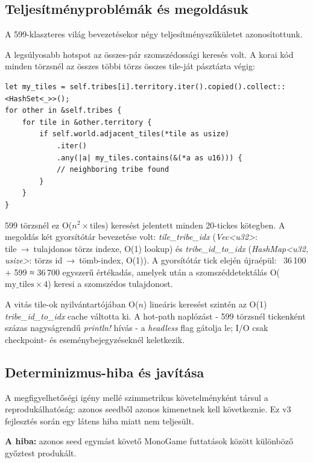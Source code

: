 \subsection*{Teljesítményproblémák és megoldásuk}

A 599-klaszteres világ bevezetésekor négy teljesítményszűkületet azonosítottunk.

A legsúlyosabb hotspot az összes-pár szomszédossági keresés volt.
A korai kód minden törzsnél az összes többi törzs összes tile-ját pásztázta végig:

\begin{lstlisting}[language={},basicstyle=\ttfamily\scriptsize,breaklines=true,caption={Régi all-pairs tile-scan: O(n\textsuperscript{2} × tiles) bottleneck}]
let my_tiles = self.tribes[i].territory.iter().copied().collect::<HashSet<_>>();
for other in &self.tribes {
    for tile in &other.territory {
        if self.world.adjacent_tiles(*tile as usize)
            .iter()
            .any(|a| my_tiles.contains(&(*a as u16))) {
            // neighboring tribe found
        }
    }
}
\end{lstlisting}

599 törzsnél ez O($n^2 \times \text{tiles}$) keresést jelentett minden 20-tickes kötegben.
A megoldás két gyorsítótár bevezetése volt:
\textit{tile\_tribe\_idx} (\textit{Vec<u32>}: tile~→~tulajdonos törzs indexe, O(1) lookup)
és \textit{tribe\_id\_to\_idx} (\textit{HashMap<u32, usize>}: törzs id~→~tömb-index, O(1)).
A gyorsítótár tick elején újraépül: ~36\,100 + 599 ≈ 36\,700 egyszerű értékadás,
amelyek után a szomszéddetektálás O($\text{my\_tiles} \times 4$) keresi a szomszédos
tulajdonost.

A vitás tile-ok nyilvántartójában O($n$) lineáris keresést szintén az O(1)
\textit{tribe\_id\_to\_idx} cache váltotta ki.
A hot-path naplózást - 599 törzsnél tickenként százas nagyságrendű \textit{println!}
hívás - a \textit{headless} flag gátolja le; I/O csak checkpoint- és eseménybejegyzéseknél
keletkezik.

\subsection*{Determinizmus-hiba és javítása}

A megfigyelhetőségi igény mellé szimmetrikus követelményként társul a reprodukálhatóság:
azonos seedből azonos kimenetnek kell következnie. Ez v3 fejlesztés során
egy látens hiba miatt nem teljesült.

\textbf{A hiba:} azonos seed egymást követő MonoGame futtatások között különböző
győztest produkált.

